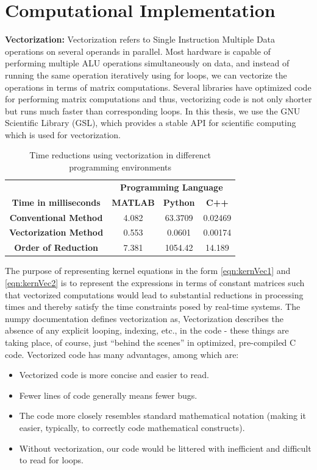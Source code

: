 \documentclass[letterpaper%
, twoside%
, 12pt%
,memoire%
, english%
,creativecommons,hyperref%
]{thETS}
\begin{document}
\section{Computational Implementation}
\textbf{Vectorization:} Vectorization refers to Single Instruction Multiple Data operations on several operands in parallel. Most hardware is capable of performing multiple ALU operations simultaneously on data, and instead of running the same operation iteratively using for loops, we can vectorize the operations in terms of matrix computations. Several libraries have optimized code for performing matrix computations and thus, vectorizing code is not only shorter but runs much faster than corresponding loops. In this thesis, we use the GNU Scientific Library (GSL), which provides a stable API for scientific computing which is used for vectorization.
\begin{table}
\parbox{0.65\textwidth}{\caption{Time reductions using vectorization in differenct programming environments}\label{Tab:vect}}
\begin{tabular}{|c|c|c|c|}
\hline
         & \multicolumn{3}{c|}{\textbf{Programming Language}}\\\cline{2-4} 
\textbf{Time in milliseconds} &   \textbf{MATLAB}   &  \textbf{Python} &   \textbf{C++} \\ \hline
\textbf{Conventional Method}  & 4.082 & 63.3709 & 0.02469    \\
\textbf{Vectorization Method} & 0.553 & 0.0601  & 0.00174    \\
\textbf{Order of Reduction}   & 7.381 & 1054.42 & 14.189     \\
\hline
\end{tabular}
\end{table}
The purpose of representing kernel equations in the form \eqref{eqn:kernVec1} and \eqref{eqn:kernVec2} is to represent the expressions in terms of constant matrices such that vectorized computations would lead to substantial reductions in processing times and thereby satisfy the time constraints posed by real-time systems. The numpy documentation \citep{oliphant2006guide} defines vectorization as, Vectorization describes the absence of any explicit looping, indexing, etc., in the code - these things are taking place, of course, just “behind the scenes” in optimized, pre-compiled C code. Vectorized code has many advantages, among which are:
\begin{itemize}
\item Vectorized code is more concise and easier to read.
\item Fewer lines of code generally means fewer bugs.
\item The code more closely resembles standard mathematical notation (making it easier, typically, to correctly code mathematical constructs).
\item Without vectorization, our code would be littered with inefficient and difficult to read for loops.
\end{itemize}
\end{document}
